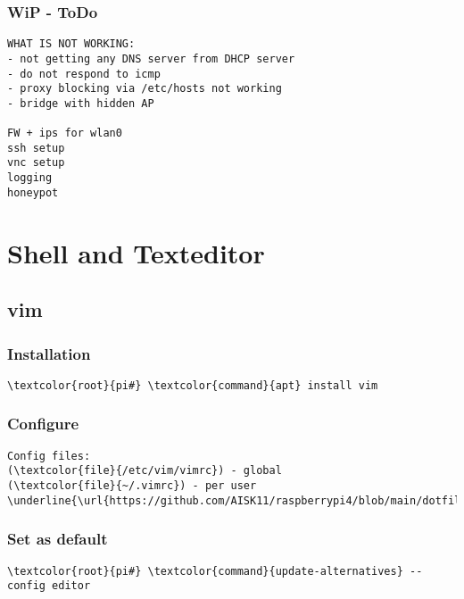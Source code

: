 \documentclass[10pt, a4paper, onecolumn, openany]{book} %
\begin{document}
\subsection{WiP - ToDo}
\begin{Verbatim}[commandchars=\\\{\}]
WHAT IS NOT WORKING:
- not getting any DNS server from DHCP server
- do not respond to icmp
- proxy blocking via /etc/hosts not working
- bridge with hidden AP

FW + ips for wlan0
ssh setup 
vnc setup
logging
honeypot
\end{Verbatim}


\chapter{Shell and Texteditor}
\section{vim}
\subsection{Installation}
\begin{Verbatim}[commandchars=\\\{\}]
    \textcolor{root}{pi#} \textcolor{command}{apt} install vim
\end{Verbatim}
\subsection{Configure}
\begin{Verbatim}[commandchars=\\\{\}]
Config files:
(\textcolor{file}{/etc/vim/vimrc}) - global
(\textcolor{file}{~/.vimrc}) - per user
\underline{\url{https://github.com/AISK11/raspberrypi4/blob/main/dotfiles/.vimrc}}
\end{Verbatim}
\subsection{Set as default}
\begin{Verbatim}[commandchars=\\\{\}]
    \textcolor{root}{pi#} \textcolor{command}{update-alternatives} --config editor
\end{Verbatim}
\end{document}
